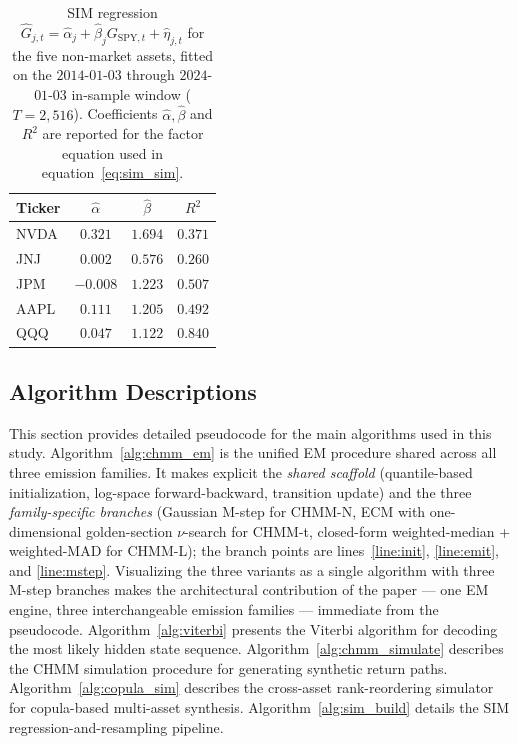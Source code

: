 \begin{table}[H]
\centering
\caption{SIM regression $\hat{G}_{j,t} = \hat{\alpha}_j + \hat{\beta}_j G_{\text{SPY},t} + \hat{\eta}_{j,t}$ for the five non-market assets, fitted on the $2014$-$01$-$03$ through $2024$-$01$-$03$ in-sample window ($T = 2{,}516$). Coefficients $\hat{\alpha}, \hat{\beta}$ and $R^2$ are reported for the factor equation used in equation~\eqref{eq:sim_sim}.}
\label{tab:sim_regression}
\small
\begin{tabular}{l ccc}
\toprule
Ticker & $\hat{\alpha}$ & $\hat{\beta}$ & $R^2$ \\
\midrule
NVDA & $0.321$   & $1.694$ & $0.371$ \\
JNJ  & $0.002$   & $0.576$ & $0.260$ \\
JPM  & $-0.008$  & $1.223$ & $0.507$ \\
AAPL & $0.111$   & $1.205$ & $0.492$ \\
QQQ  & $0.047$   & $1.122$ & $0.840$ \\
\bottomrule
\end{tabular}
\end{table}

\subsection{Algorithm Descriptions}
\label{sec:algorithms}

This section provides detailed pseudocode for the main algorithms used in this study.
Algorithm~\ref{alg:chmm_em} is the unified EM procedure shared across all three emission families.
It makes explicit the \emph{shared scaffold} (quantile-based initialization, log-space forward-backward, transition update) and the three \emph{family-specific branches} (Gaussian M-step for CHMM-N, ECM with one-dimensional golden-section $\nu$-search for CHMM-t, closed-form weighted-median + weighted-MAD for CHMM-L); the branch points are lines~\ref{line:init}, \ref{line:emit}, and \ref{line:mstep}.
Visualizing the three variants as a single algorithm with three M-step branches makes the architectural contribution of the paper --- one EM engine, three interchangeable emission families --- immediate from the pseudocode.
Algorithm~\ref{alg:viterbi} presents the Viterbi algorithm for decoding the most likely hidden state sequence.
Algorithm~\ref{alg:chmm_simulate} describes the CHMM simulation procedure for generating synthetic return paths.
Algorithm~\ref{alg:copula_sim} describes the cross-asset rank-reordering simulator for copula-based multi-asset synthesis.
Algorithm~\ref{alg:sim_build} details the SIM regression-and-resampling pipeline.

